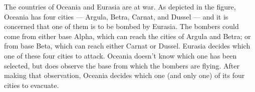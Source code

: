 \documentclass[addpoints ]{exam}
\begin{document}
\begin{questions}

\newpage


\question[20] 
The countries of Oceania and Eurasia are at war.
As depicted in the figure, Oceania has four cities —
Argula, Betra, Carnat, and Dussel — 
and it is concerned that one of them is to be bombed by Eurasia.
The bombers could come from either base Alpha,
which can reach the cities of Argula and Betra;
or from base Beta, which can reach either Carnat or Dussel.
Eurasia decides which one of these four cities to attack.
Oceania doesn’t know which one has been selected,
but does observe the base from which the bombers are flying.
After making that observation, Oceania decides which one 
(and only one) of its four cities to evacuate.


\end{questions}
\end{document}
